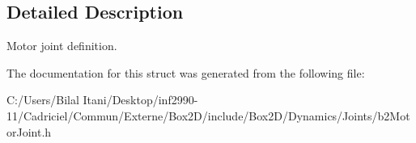 \subsection{Detailed Description}
Motor joint definition. 

The documentation for this struct was generated from the following file\+:\begin{DoxyCompactItemize}
\item 
C\+:/\+Users/\+Bilal Itani/\+Desktop/inf2990-\/11/\+Cadriciel/\+Commun/\+Externe/\+Box2\+D/include/\+Box2\+D/\+Dynamics/\+Joints/b2\+Motor\+Joint.\+h\end{DoxyCompactItemize}
